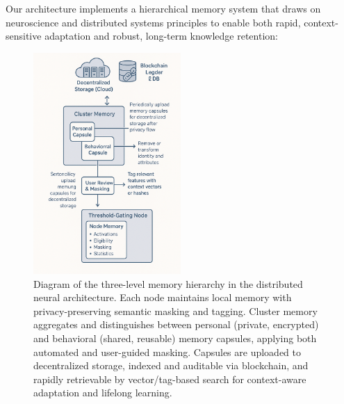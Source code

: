 \documentclass[11pt]{article}
\begin{document}
Our architecture implements a hierarchical memory system that draws on neuroscience and distributed systems principles to enable both rapid, context-sensitive adaptation and robust, long-term knowledge retention:
\begin{figure}[ht]
    \centering
    \includegraphics[width=0.5\textwidth]{architecture_diagrams/memory.png}
    \caption{
        Diagram of the three-level memory hierarchy in the distributed neural architecture. Each node maintains local memory with privacy-preserving semantic masking and tagging. Cluster memory aggregates and distinguishes between personal (private, encrypted) and behavioral (shared, reusable) memory capsules, applying both automated and user-guided masking. Capsules are uploaded to decentralized storage, indexed and auditable via blockchain, and rapidly retrievable by vector/tag-based search for context-aware adaptation and lifelong learning.
    }
    \label{fig:memory-hierarchy}
\end{figure}
\end{document}
